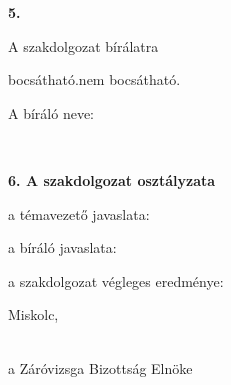 \vspace{0.30cm}

\noindent
\begin{minipage}[t]{0.08\textwidth}
\textbf{5.}
\end{minipage}
\begin{minipage}[t]{0.88\textwidth}
\begin{center}
A szakdolgozat bírálatra
\end{center}
\vspace{1mm}
\hspace*{2cm} bocsátható.\hfill nem bocsátható.

\vspace{1mm}
\noindent A bíráló neve: \makebox[8cm]{\dotfill}

\vspace{0.24cm}
\makebox[5cm]{\dotfill}\hfill\makebox[7cm]{\dotfill}\\[-1mm]
\hfill{}
\end{minipage}

\vspace{0.30cm}

\noindent\textbf{6. A szakdolgozat osztályzata}

\vspace{1mm}
\hspace*{2cm} a témavezető javaslata: \makebox[5cm]{\dotfill}

\vspace{0.5mm}
\hspace*{2cm} a bíráló javaslata: \makebox[5cm]{\dotfill}

\vspace{0.5mm}
\hspace*{2cm} a szakdolgozat végleges eredménye: \makebox[5cm]{\dotfill}

\vspace{0.24cm}
\noindent Miskolc, \makebox[5cm]{\dotfill}

\vfill
\begin{flushright}
\makebox[7cm]{\dotfill}\\[-1mm]
a Záróvizsga Bizottság Elnöke
\end{flushright}
\endgroup
